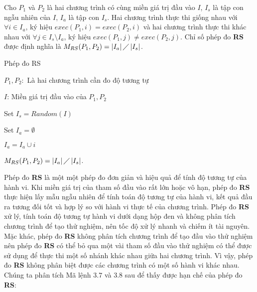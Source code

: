 \begin{definition}[Phép đo RS]
	Cho $P_{1}$ và $P_{2}$ là hai chương trình có cùng miền giá trị đầu vào $I$, $I_{s}$ là tập con ngẫu nhiên của $I$, $I_{a}$ là tập con $I_{s}$. Hai chương trình thực thi giống nhau với $\forall i \in I_{a}$, ký hiệu $exec(P_{1}, i) = exec(P_{2}, i)$ và hai chương trình thực thi khác nhau với $\forall j \in I_{s} \setminus I_{a}$, ký hiệu $exec(P_{1}, j) \neq exec(P_{2}, j)$. Chỉ số phép đo \textbf{RS} được định nghĩa là $M_{RS}(P_{1}, P_{2}) = \left|I_{a}\right| \diagup \left|I_{s}\right| $.
\end{definition}

\begin{algorithm}[H]
	\caption{Phép đo RS}
	\begin{algorithmic}	
		\item $P_{1}, P_{2}:$ Là hai chương trình cần đo độ tương tự
		\item $I$: Miền giá trị đầu vào của $P_{1}, P_{2}$
		\item Set $I_{s} = Random(I)$ 
		\item Set $I_{a} = \emptyset$ 
		  
				
				\State $I_{a} = I_{a} \cup i$		
				\EndIf
		\EndWhile
		\item $M_{RS}(P_{1}, P_{2}) = \left|I_{a}\right| \diagup \left|I_{s}\right| $. 
	\end{algorithmic}
\end{algorithm}


Phép đo \textbf{RS} là một một phép đo đơn giản và hiệu quả để tính độ tương tự của hành vi. Khi miền giá trị của tham số đầu vào rất lớn hoặc vô hạn, phép đo \textbf{RS} thực hiện lấy mẫu ngẫu nhiên để tính toán độ tương tự của hành vi, kết quả đầu ra tương đối tốt và hợp lý so với hành vi thực tế của chương trình. Phép đo \textbf{RS} xử lý, tính toán độ tương tự hành vi dưới dạng hộp đen và không phân tích chương trình để tạo thử nghiệm, nên tốc độ xử lý nhanh và chiếm ít tài nguyên. Mặc khác, phép đo \textbf{RS} không phân tích chương trình để tạo đầu vào thử nghiệm nên phép đo \textbf{RS} có thể bỏ qua một vài tham số đầu vào thử nghiệm có thể được sử dụng để thực thi một số nhánh khác nhau giữa hai chương trình. Vì vậy, phép đo \textbf{RS} không phân biệt được các chương trình có một số hành vi khác nhau. Chúng ta phân tích Mã lệnh $3.7$ và $3.8$ sau để thấy được hạn chế của phép đo \textbf{RS}:

